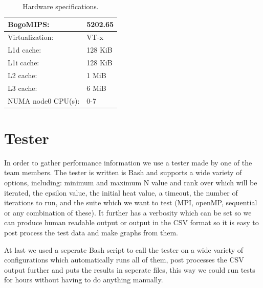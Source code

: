 \documentclass[a4paper]{article}
\begin{document}
\begin{table}[h]
\begin{tabular}{|l|l|}
        BogoMIPS:            &    5202.65\\\hline
        Virtualization:      &    VT-x\\\hline
        L1d cache:           &    128 KiB\\\hline
        L1i cache:           &    128 KiB\\\hline
        L2 cache:            &    1 MiB\\\hline
        L3 cache:            &    6 MiB\\\hline
        NUMA node0 CPU(s):   &    0-7\\
        \hline
    \end{tabular}
    \caption{Hardware specifications.}
    \label{tab: hardware}
\end{table}

\section{Tester}
In order to gather performance information we use a tester made by one of the team members. The tester is written is Bash and supports a wide variety of options, including: minimum and maximum N value and rank over which will be iterated, the epsilon value, the initial heat value, a timeout, the number of iterations to run, and the suite which we want to test (MPI, openMP, sequential or any combination of these). It further has a verbosity which can be set so we can produce human readable output or output in the CSV format so it is easy to post process the test data and make graphs from them.

At last we used a seperate Bash script to call the tester on a wide variety of configurations which automatically runs all of them, post processes the CSV output further and puts the results in seperate files, this way we could run tests for hours without having to do anything manually.
    
\end{document}
